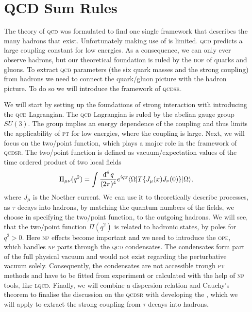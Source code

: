 \documentclass[../../index.tex]{subfiles}
\begin{document}
\chapter{QCD Sum Rules}
\label{ch:theoreticalBackground}
The theory of \textsc{qcd} was formulated to find one single framework that
describes the many hadrons that exist. Unfortunately making use of
 is limited. \textsc{qcd} predicts a
large coupling constant for low energies. As a consequence, we can only ever
observe hadrons, but our theoretical foundation is ruled by the \textsc{dof} of
quarks and gluons. To extract \textsc{qcd} parameters (the six quark masses and
the strong coupling) from hadrons we need to connect the quark\-/gluon picture
with the hadron picture. To do so we will introduce the framework of
\textsc{qcdsr}.

We will start by setting up the foundations of strong interaction with
introducing the \textsc{qcd} Lagrangian. The \textsc{qcd} Lagrangian is ruled by
the abelian gauge group \(SU(3)\). The group implies an energy dependence of the
coupling and thus limits the applicability of \textsc{pt} for low energies,
where the coupling is large. Next, we will focus on the two\-/point function,
which plays a major role in the framework of \textsc{qcdsr}. The two\-/point
function is defined as vacuum\-/expectation values of the time ordered product
of two local fields
\begin{equation}
  \Pi_{\mu\nu}(q^2) = \int\fdif{q} e^{iqx} \langle\Omega\vert T\{ J_\mu(x) J_\nu(0) \} \vert\Omega\rangle,
\end{equation}
where \(J_\mu\) is the Noether current. We can use it to theoretically describe
processes, as \(\tau\) decays into hadrons, by matching the quantum numbers of
the fields, we choose in specifying the two\-/point function, to the outgoing
hadrons. We will see, that the two\-/point function \(\Pi(q^2)\) is related to
hadronic states, by poles for \(q^2> 0\). Here \textsc{np} effects become
important and we need to introduce the \textsc{ope}, which handles \textsc{np}
parts through the \textsc{qcd} condensates. The condensates form part of the
full physical vacuum and would not exist regarding the perturbative vacuum
solely. Consequently, the condensates are not accessible trough \textsc{pt}
methods and have to be fitted from experiment or calculated with the help of
\textsc{np} tools, like \textsc{lqcd}. Finally, we will combine a dispersion
relation and Cauchy's theorem to finalise the discussion on the \textsc{qcdsr}
with developing the , which we will apply
to extract the strong coupling from \(\tau\) decays into hadrons.
\end{document}
